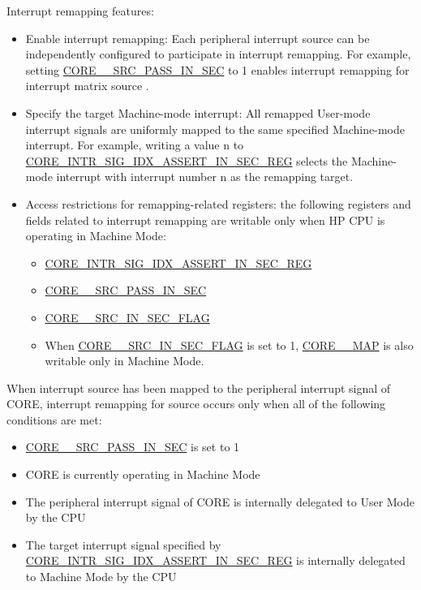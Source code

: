 \documentclass[main\_\_EN.tex]{subfiles}
\begin{document}
Interrupt remapping features:
\begin{itemize}
    \item Enable interrupt remapping: Each peripheral interrupt source can be independently configured to participate in interrupt remapping. For example, setting \hyperref[fielddesc:CORE0SOURCESRCPASSINSEC]{CORE\_\_SRC\_PASS\_IN\_SEC} to 1 enables interrupt remapping for interrupt matrix source .
    \item Specify the target Machine-mode interrupt: All remapped User-mode interrupt signals are uniformly mapped to the same specified Machine-mode interrupt. For example, writing a value n to \hyperref[regdesc:CORE0INTRSIGIDXASSERTINSECREG]{CORE\_INTR\_SIG\_IDX\_ASSERT\_IN\_SEC\_REG} selects the Machine-mode interrupt with interrupt number n as the remapping target.
    \item Access restrictions for remapping-related registers: the following registers and fields related to interrupt remapping are writable only when HP CPU is operating in Machine Mode:
  \begin{itemize}
    \item \hyperref[regdesc:CORE0INTRSIGIDXASSERTINSECREG]{CORE\_INTR\_SIG\_IDX\_ASSERT\_IN\_SEC\_REG}
    \item \hyperref[fielddesc:CORE0SOURCESRCPASSINSEC]{CORE\_\_SRC\_PASS\_IN\_SEC}
    \item \hyperref[fielddesc:CORE0SOURCESRCINSECFLAG]{CORE\_\_SRC\_IN\_SEC\_FLAG}
    \item When \hyperref[fielddesc:CORE0SOURCESRCINSECFLAG]{CORE\_\_SRC\_IN\_SEC\_FLAG} is set to 1,
          \hyperref[fielddesc:CORE0SOURCEMAP]{CORE\_\_MAP} is also writable only in Machine Mode.
  \end{itemize}
\end{itemize}

When interrupt source  has been mapped to the peripheral interrupt signal  of CORE, interrupt remapping for source  occurs only when all of the following conditions are met:
\begin{itemize}
  \item \hyperref[fielddesc:CORE0SOURCESRCPASSINSEC]{CORE\_\_SRC\_PASS\_IN\_SEC} is set to 1
  \item CORE is currently operating in Machine Mode
  \item The peripheral interrupt signal  of CORE is internally delegated to User Mode by the CPU
  \item The target interrupt signal specified by \hyperref[regdesc:CORE0INTRSIGIDXASSERTINSECREG]{CORE\_INTR\_SIG\_IDX\_ASSERT\_IN\_SEC\_REG} is internally delegated to Machine Mode by the CPU
\end{itemize}
\end{document}
